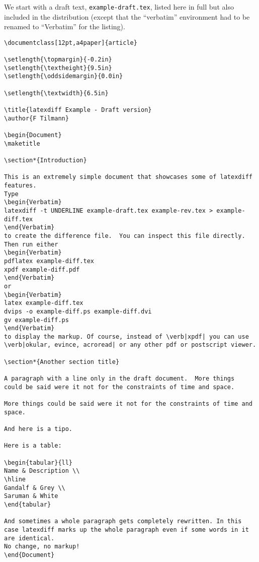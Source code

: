 \documentclass{article}
\begin{document}
We start with a draft text, \verb|example-draft.tex|, listed here in
full but also included in the distribution (except that the ``verbatim'' environment had
to be renamed to ``Verbatim'' for the listing).
{\scriptsize
\begin{verbatim}
\documentclass[12pt,a4paper]{article}

\setlength{\topmargin}{-0.2in}
\setlength{\textheight}{9.5in}
\setlength{\oddsidemargin}{0.0in}

\setlength{\textwidth}{6.5in}

\title{latexdiff Example - Draft version}
\author{F Tilmann}

\begin{Document}
\maketitle

\section*{Introduction}

This is an extremely simple document that showcases some of latexdiff features.
Type
\begin{Verbatim}
latexdiff -t UNDERLINE example-draft.tex example-rev.tex > example-diff.tex
\end{Verbatim}
to create the difference file.  You can inspect this file directly. Then run either 
\begin{Verbatim}
pdflatex example-diff.tex
xpdf example-diff.pdf
\end{Verbatim}
or
\begin{Verbatim}
latex example-diff.tex
dvips -o example-diff.ps example-diff.dvi
gv example-diff.ps
\end{Verbatim}
to display the markup. Of course, instead of \verb|xpdf| you can use 
\verb|okular, evince, acroread| or any other pdf or postscript viewer.

\section*{Another section title}

A paragraph with a line only in the draft document.  More things 
could be said were it not for the constraints of time and space.

More things could be said were it not for the constraints of time and space.

And here is a tipo. 

Here is a table:

\begin{tabular}{ll}
Name & Description \\
\hline
Gandalf & Grey \\
Saruman & White
\end{tabular}

And sometimes a whole paragraph gets completely rewritten. In this
case latexdiff marks up the whole paragraph even if some words in it
are identical.
No change, no markup!
\end{Document}
\end{verbatim}
}
\end{document}
